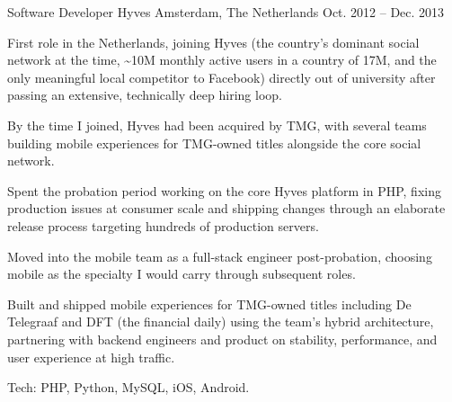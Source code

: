 \begin{cventries}
  \cventry
    {Software Developer} %
    {Hyves} %
    {Amsterdam, The Netherlands} %
    {Oct. 2012 -- Dec. 2013} %
    {
      \begin{cvitems} %
        \item {First role in the Netherlands, joining Hyves (the country's dominant social network at the time, \textasciitilde10M monthly active users in a country of 17M, and the only meaningful local competitor to Facebook) directly out of university after passing an extensive, technically deep hiring loop.}
        \item {By the time I joined, Hyves had been acquired by TMG, with several teams building mobile experiences for TMG-owned titles alongside the core social network.}
        \item {Spent the probation period working on the core Hyves platform in PHP, fixing production issues at consumer scale and shipping changes through an elaborate release process targeting hundreds of production servers.}
        \item {Moved into the mobile team as a full-stack engineer post-probation, choosing mobile as the specialty I would carry through subsequent roles.}
        \item {Built and shipped mobile experiences for TMG-owned titles including De Telegraaf and DFT (the financial daily) using the team's hybrid architecture, partnering with backend engineers and product on stability, performance, and user experience at high traffic.}
        \item {Tech: PHP, Python, MySQL, iOS, Android.}
      \end{cvitems}
    }


\end{cventries}
